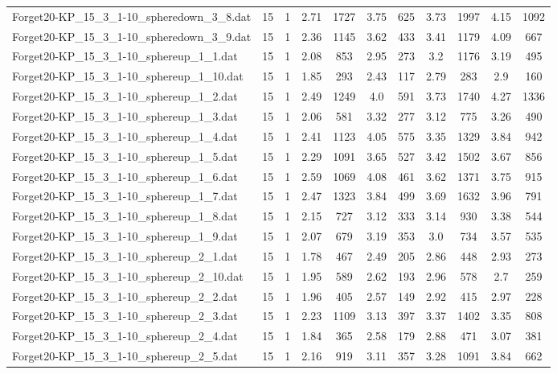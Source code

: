 \begin{table}[!ht]
\begin{tabular}{lcccccccccc}
Forget20-KP\_15\_3\_1-10\_spheredown\_3\_8.dat & 15 & 1 & 2.71 & 1727 & 3.75 & 625 & 3.73 & 1997 & 4.15 & 1092 \\
Forget20-KP\_15\_3\_1-10\_spheredown\_3\_9.dat & 15 & 1 & 2.36 & 1145 & 3.62 & 433 & 3.41 & 1179 & 4.09 & 667 \\
Forget20-KP\_15\_3\_1-10\_sphereup\_1\_1.dat & 15 & 1 & 2.08 & 853 & 2.95 & 273 & 3.2 & 1176 & 3.19 & 495 \\
Forget20-KP\_15\_3\_1-10\_sphereup\_1\_10.dat & 15 & 1 & 1.85 & 293 & 2.43 & 117 & 2.79 & 283 & 2.9 & 160 \\
Forget20-KP\_15\_3\_1-10\_sphereup\_1\_2.dat & 15 & 1 & 2.49 & 1249 & 4.0 & 591 & 3.73 & 1740 & 4.27 & 1336 \\
Forget20-KP\_15\_3\_1-10\_sphereup\_1\_3.dat & 15 & 1 & 2.06 & 581 & 3.32 & 277 & 3.12 & 775 & 3.26 & 490 \\
Forget20-KP\_15\_3\_1-10\_sphereup\_1\_4.dat & 15 & 1 & 2.41 & 1123 & 4.05 & 575 & 3.35 & 1329 & 3.84 & 942 \\
Forget20-KP\_15\_3\_1-10\_sphereup\_1\_5.dat & 15 & 1 & 2.29 & 1091 & 3.65 & 527 & 3.42 & 1502 & 3.67 & 856 \\
Forget20-KP\_15\_3\_1-10\_sphereup\_1\_6.dat & 15 & 1 & 2.59 & 1069 & 4.08 & 461 & 3.62 & 1371 & 3.75 & 915 \\
Forget20-KP\_15\_3\_1-10\_sphereup\_1\_7.dat & 15 & 1 & 2.47 & 1323 & 3.84 & 499 & 3.69 & 1632 & 3.96 & 791 \\
Forget20-KP\_15\_3\_1-10\_sphereup\_1\_8.dat & 15 & 1 & 2.15 & 727 & 3.12 & 333 & 3.14 & 930 & 3.38 & 544 \\
Forget20-KP\_15\_3\_1-10\_sphereup\_1\_9.dat & 15 & 1 & 2.07 & 679 & 3.19 & 353 & 3.0 & 734 & 3.57 & 535 \\
Forget20-KP\_15\_3\_1-10\_sphereup\_2\_1.dat & 15 & 1 & 1.78 & 467 & 2.49 & 205 & 2.86 & 448 & 2.93 & 273 \\
Forget20-KP\_15\_3\_1-10\_sphereup\_2\_10.dat & 15 & 1 & 1.95 & 589 & 2.62 & 193 & 2.96 & 578 & 2.7 & 259 \\
Forget20-KP\_15\_3\_1-10\_sphereup\_2\_2.dat & 15 & 1 & 1.96 & 405 & 2.57 & 149 & 2.92 & 415 & 2.97 & 228 \\
Forget20-KP\_15\_3\_1-10\_sphereup\_2\_3.dat & 15 & 1 & 2.23 & 1109 & 3.13 & 397 & 3.37 & 1402 & 3.35 & 808 \\
Forget20-KP\_15\_3\_1-10\_sphereup\_2\_4.dat & 15 & 1 & 1.84 & 365 & 2.58 & 179 & 2.88 & 471 & 3.07 & 381 \\
Forget20-KP\_15\_3\_1-10\_sphereup\_2\_5.dat & 15 & 1 & 2.16 & 919 & 3.11 & 357 & 3.28 & 1091 & 3.84 & 662 \\

\end{tabular}
\end{table}
